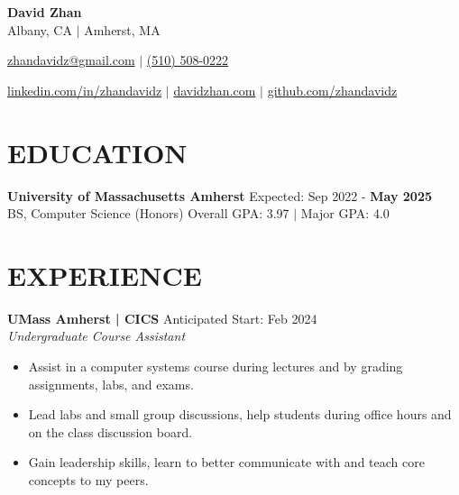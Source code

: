 \documentclass[letterpaper,10pt]{extarticle}
\begin{document}
\pagestyle{empty}

\begin{center}
\textbf{\Large David Zhan}\\[2pt] %
Albany, CA $|$ Amherst, MA

\href{mailto:zhandavidz@gmail.com}{zhandavidz@gmail.com} $|$ \href{tel:5105080222}{(510) 508-0222}

\href{https://www.linkedin.com/in/zhandavidz}{linkedin.com/in/zhandavidz} $|$ \href{https://davidzhan.com}{davidzhan.com} $|$ \href{https://github.com/zhandavidz}{github.com/zhandavidz}
\end{center}

\section*{EDUCATION}
\noindent
\textbf{University of Massachusetts Amherst} \hfill Expected: Sep 2022 - \textbf{May 2025}\\ %
BS, Computer Science (Honors) \hfill Overall GPA: 3.97 $|$ Major GPA: 4.0 %

\section*{EXPERIENCE}

\noindent
\textbf{UMass Amherst | CICS} \hfill Anticipated Start: Feb 2024 \\ %
\textit{Undergraduate Course Assistant} %
\begin{itemize}
    \item Assist in a computer systems course during lectures and by grading assignments, labs, and exams.
    \item Lead labs and small group discussions, help students during office hours and on the class discussion board.
    \item Gain leadership skills, learn to better communicate with and teach core concepts to my peers.
\end{itemize}
\end{document}
